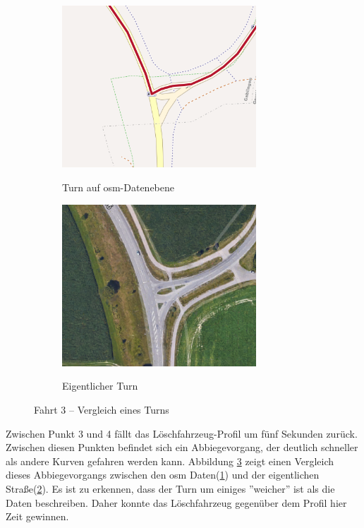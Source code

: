 \begin{figure}[htb]
\centering
\begin{subfigure}{0.49\textwidth}
\centering
\includegraphics[width = 0.80\textwidth]{../media/Fahrt3_Turn.png} \\
\caption{Turn auf \gls{osm}-Datenebene}
\label{fig:turnosm}
\end{subfigure}
\begin{subfigure}{0.49\textwidth}
\centering
\includegraphics[width = 0.80\textwidth]{../media/Fahrt3_actualturn.png} \\
\caption{Eigentlicher Turn}
\label{fig:turnworld}
\end{subfigure}
\caption{Fahrt 3 -- Vergleich eines Turns}
\label{fig:turn}
\end{figure}

Zwischen Punkt 3 und 4 fällt das Löschfahrzeug-Profil um fünf Sekunden zurück.
Zwischen diesen Punkten befindet sich ein Abbiegevorgang, der deutlich schneller als andere Kurven gefahren werden kann.
Abbildung \ref{fig:turn} zeigt einen Vergleich dieses Abbiegevorgangs zwischen den \gls{osm} Daten(\ref{fig:turnosm}) und der eigentlichen Straße(\ref{fig:turnworld}).
Es ist zu erkennen, dass der Turn um einiges ''weicher'' ist als die Daten beschreiben.
Daher konnte das Löschfahrzeug gegenüber dem Profil hier Zeit gewinnen.

